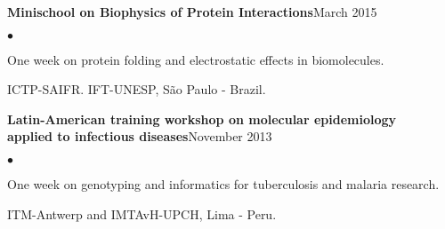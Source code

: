 \documentclass[margin,line]{res}
\newenvironment{list2}{
  \begin{list}{$\bullet$}{%
      \setlength{\itemsep}{0in}
      \setlength{\parsep}{0in} \setlength{\parskip}{0in}
      \setlength{\topsep}{0in} \setlength{\partopsep}{0in}
      \setlength{\leftmargin}{0.2in}}}{\end{list}}
\begin{document}
\begin{resume}
{\bf Minischool on Biophysics of Protein Interactions}\hfill {March 2015}\\
	\vspace*{-.1in}%
\begin{list2} %
	\item One week on protein folding and electrostatic effects in biomolecules.%
	\item ICTP-SAIFR. IFT-UNESP, S{\~a}o Paulo - Brazil.%
\end{list2}




{\bf Latin-American training workshop on molecular epidemiology \\applied to infectious diseases}\hfill {November 2013}\\
	\vspace*{-.1in}%
\begin{list2} %
	\item One week on genotyping and informatics for tuberculosis and malaria research. %
	\item ITM-Antwerp and IMTAvH-UPCH, Lima - Peru.\\%
\end{list2}


\end{resume}
\end{document}
